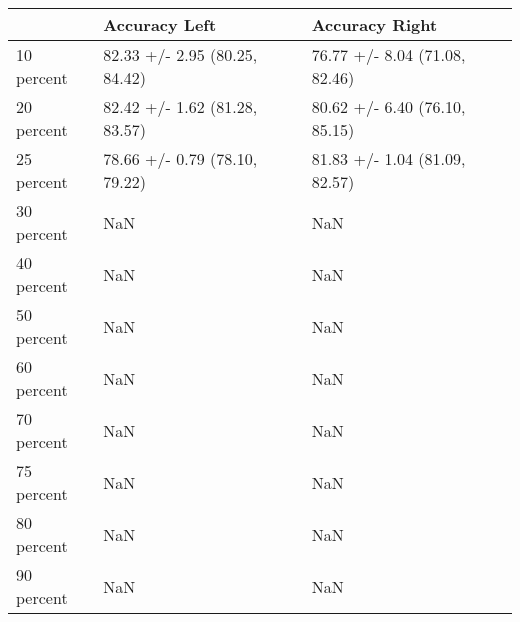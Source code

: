 \begin{tabular}{lll}
\toprule
{} &                  Accuracy Left &                 Accuracy Right \\
\midrule
10 percent &  82.33 +/- 2.95 (80.25, 84.42) &  76.77 +/- 8.04 (71.08, 82.46) \\
20 percent &  82.42 +/- 1.62 (81.28, 83.57) &  80.62 +/- 6.40 (76.10, 85.15) \\
25 percent &  78.66 +/- 0.79 (78.10, 79.22) &  81.83 +/- 1.04 (81.09, 82.57) \\
30 percent &                            NaN &                            NaN \\
40 percent &                            NaN &                            NaN \\
50 percent &                            NaN &                            NaN \\
60 percent &                            NaN &                            NaN \\
70 percent &                            NaN &                            NaN \\
75 percent &                            NaN &                            NaN \\
80 percent &                            NaN &                            NaN \\
90 percent &                            NaN &                            NaN \\
\bottomrule
\end{tabular}
